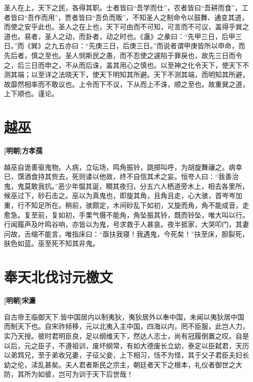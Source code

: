 \documentclass[UTF8,titlepage,oneside]{ctexbook}
\begin{document}
圣人在上，天下之民，各得其职。士者皆曰“吾学而仕”，农者皆曰“吾耕而食”，工者皆曰“吾作而用”，贾者皆曰“吾负而贩”，不知圣人之制命令以鼓舞、通变其道，而使之安乎此也。圣人之在上也，天下可由而不可知，可言而不可议，盖得乎巽之道也。易者，圣人之动，而卦者，动之时也。《蛊》之彖曰：“先甲三日，后甲三日。”而《巽》之九五亦曰：“先庚三日，后庚三日。”而说者谓甲庚皆所以申命，而先后者，慎之至也。圣人悯斯民之愚，而不忍使之遽陷于罪戾也，故先三日而令之，后三日而申之，不从而后诛，盖其用心之慎也。以至神之化令天下，使天下不测其端；以至详之法晓天下，使天下明知其所避。天下不测其端，而明知其所避，故靡然相率而不敢议也。上令而下不议，下从而上不诛，顺之至也。故重巽之道，上下顺也。谨论。



\chapter*{越巫}
\begin{center}
	\textbf{[明朝]方孝孺}
\end{center}

越巫自诡善驱鬼物。人病，立坛场，鸣角振铃，跳掷叫呼，为胡旋舞禳之。病幸已，馔酒食持其赀去，死则诿以他故，终不自信其术之妄。恒夸人曰：“我善治鬼，鬼莫敢我抗。”恶少年愠其诞，瞷其夜归，分五六人栖道旁木上，相去各里所，候巫过下，砂石击之。巫以为真鬼也，即旋其角，且角且走，心大骇，首岑岑加重，行不知足所在。稍前，骇颇定，木间砂乱下如初，又旋而角，角不能成音，走愈急。复至前，复如初，手栗气慑不能角，角坠振其铃，既而铃坠，唯大叫以行。行闻履声及叶鸣谷响，亦皆以为鬼，号求救于人甚哀。夜半抵家，大哭叩门，其妻问故，舌缩不能言，唯指床曰：“亟扶我寝！我遇鬼，今死矣！”扶至床，胆裂死，肤色如蓝。巫至死不知其非鬼。



\chapter*{奉天北伐讨元檄文}
\begin{center}
	\textbf{[明朝]宋濂}
\end{center}

自古帝王临御天下,皆中国居内以制夷狄，夷狄居外以奉中国，未闻以夷狄居中国而制天下也。自宋祚倾移，元以北夷入主中国，四海以内，罔不臣服，此岂人力，实乃天授。彼时君明臣良，足以纲维天下，然达人志士，尚有冠履倒置之叹。自是以后，元之臣子，不遵祖训，废坏纲常，有如大德废长立幼，泰定以臣弑君，天历以弟鸩兄，至于弟收兄妻，子征父妾，上下相习，恬不为怪，其于父子君臣夫妇长幼之伦，渎乱甚矣。夫人君者斯民之宗主，朝廷者天下之根本，礼仪者御世之大防，其所为如彼，岂可为训于天下后世哉！
\end{document}
